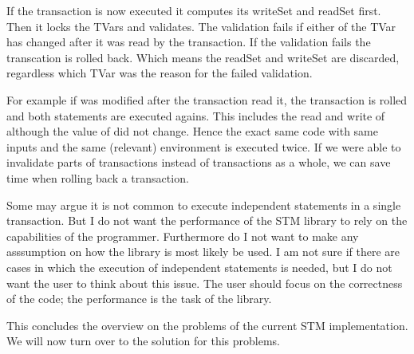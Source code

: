 If the transaction is now executed it computes its writeSet and readSet first. Then it locks the TVars and 
validates. The validation fails if either of the TVar has changed after it was read by the transaction.
If the validation fails the transcation is rolled back. Which means the readSet and writeSet are discarded,
regardless which TVar was the reason for the failed validation. 

For example if  was modified after the transaction read it, the transaction is rolled and both 
statements are executed agains. This includes the read and write of  although the value of 
 did not change. Hence the exact same code with same inputs and the same (relevant) environment is 
executed twice. If we were able to invalidate parts of transactions instead of transactions as a whole, 
we can save time when rolling back a transaction.  

Some may argue it is not common to execute independent statements in a single transaction. But I do not want  
the performance of the STM library to rely on the capabilities of the programmer. 
Furthermore do I not want to make any asssumption on how the library is most likely be used. 
I am not sure if there
are cases in which the execution of independent statements is needed, but I do not want the user to think 
about this issue. The user should focus on the correctness of the code; the performance is the task of the
library.  

This concludes the overview on the problems of the current STM implementation. We will now turn over to the 
solution for this problems.







% 
% 

